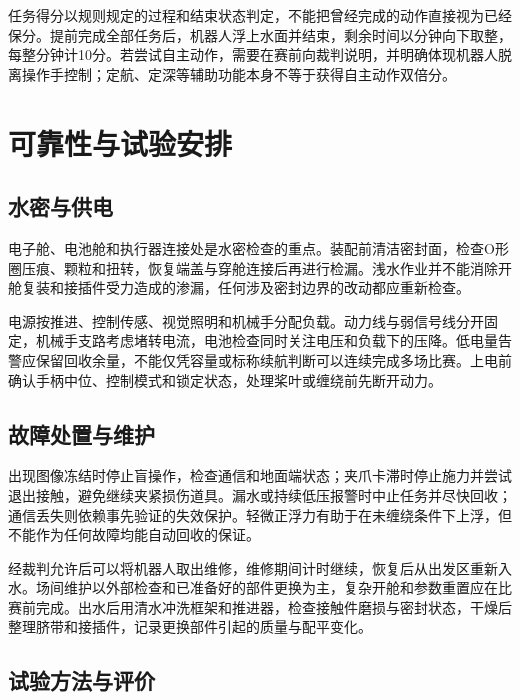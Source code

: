 任务得分以规则规定的过程和结束状态判定，不能把曾经完成的动作直接视为已经保分。提前完成全部任务后，机器人浮上水面并结束，剩余时间以分钟向下取整，每整分钟计10分。若尝试自主动作，需要在赛前向裁判说明，并明确体现机器人脱离操作手控制；定航、定深等辅助功能本身不等于获得自主动作双倍分。\par

\section{可靠性与试验安排}

\subsection{水密与供电}

电子舱、电池舱和执行器连接处是水密检查的重点。装配前清洁密封面，检查O形圈压痕、颗粒和扭转，恢复端盖与穿舱连接后再进行检漏。浅水作业并不能消除开舱复装和接插件受力造成的渗漏，任何涉及密封边界的改动都应重新检查。\par

电源按推进、控制传感、视觉照明和机械手分配负载。动力线与弱信号线分开固定，机械手支路考虑堵转电流，电池检查同时关注电压和负载下的压降。低电量告警应保留回收余量，不能仅凭容量或标称续航判断可以连续完成多场比赛。上电前确认手柄中位、控制模式和锁定状态，处理桨叶或缠绕前先断开动力。\par

\subsection{故障处置与维护}

出现图像冻结时停止盲操作，检查通信和地面端状态；夹爪卡滞时停止施力并尝试退出接触，避免继续夹紧损伤道具。漏水或持续低压报警时中止任务并尽快回收；通信丢失则依赖事先验证的失效保护。轻微正浮力有助于在未缠绕条件下上浮，但不能作为任何故障均能自动回收的保证。\par

经裁判允许后可以将机器人取出维修，维修期间计时继续，恢复后从出发区重新入水。场间维护以外部检查和已准备好的部件更换为主，复杂开舱和参数重置应在比赛前完成。出水后用清水冲洗框架和推进器，检查接触件磨损与密封状态，干燥后整理脐带和接插件，记录更换部件引起的质量与配平变化。\par

\subsection{试验方法与评价}

